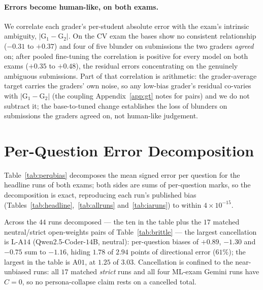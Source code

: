 \paragraph{Errors become human-like, on both exams.}
We correlate each grader's per-student absolute error with the exam's intrinsic ambiguity, $|\mathrm{G}_1 - \mathrm{G}_2|$. On the CV exam the bases show no consistent relationship ($-0.31$ to $+0.37$) and four of five blunder on submissions the two graders \emph{agreed} on; after pooled fine-tuning the correlation is positive for every model on both exams ($+0.35$ to $+0.48$), the residual errors concentrating on the genuinely ambiguous submissions. Part of that correlation is arithmetic: the grader-average target carries the graders' own noise, so any low-bias grader's residual co-varies with $|\mathrm{G}_1 - \mathrm{G}_2|$ (the coupling Appendix~\ref{app:gt} notes for pairs) and we do not subtract it; the base-to-tuned change establishes the loss of blunders on submissions the graders agreed on, not human-like judgement.


\clearpage
\section{Per-Question Error Decomposition}
\label{app:perq}

Table~\ref{tab:perqbias} decomposes the mean signed error per question for the headline runs of both exams; both sides are sums of per-question marks, so the decomposition is exact, reproducing each run's published bias (Tables~\ref{tab:headline},~\ref{tab:allruns} and~\ref{tab:iaruns}) to within $4 \times 10^{-15}$.

Across the $44$ runs decomposed --- the ten in the table plus the $17$ matched neutral/strict open-weights pairs of Table~\ref{tab:brittle} --- the largest cancellation is L-A$14$ (Qwen2.5-Coder-$14$B, neutral): per-question biases of $+0.89$, $-1.30$ and $-0.75$ sum to $-1.16$, hiding $1.78$ of $2.94$ points of directional error ($61\%$); the largest in the table is A$01$, at $1.25$ of $3.03$. Cancellation is confined to the near-unbiased runs: all $17$ matched \emph{strict} runs and all four ML-exam Gemini runs have $C = 0$, so no persona-collapse claim rests on a cancelled total.

